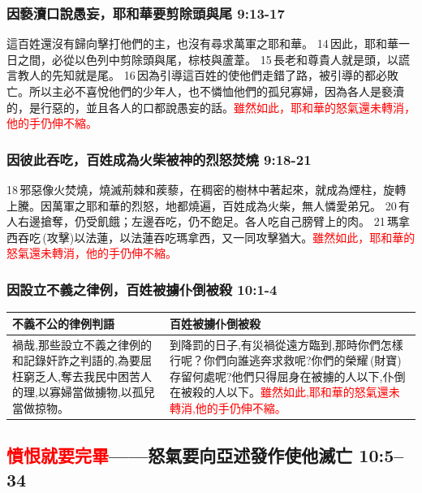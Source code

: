 \subsubsection{因褻瀆口說愚妄，耶和華要剪除頭與尾 9:13-17}
這百姓還沒有歸向擊打他們的主，也沒有尋求萬軍之耶和華。 14 因此，耶和華一日之間，必從以色列中剪除頭與尾，棕枝與蘆葦。 15 長老和尊貴人就是頭，以謊言教人的先知就是尾。 16 因為引導這百姓的使他們走錯了路，被引導的都必敗亡。所以主必不喜悅他們的少年人，也不憐恤他們的孤兒寡婦，因為各人是褻瀆的，是行惡的，並且各人的口都說愚妄的話。\textcolor{red}{雖然如此，耶和華的怒氣還未轉消，他的手仍伸不縮。}

\subsubsection{因彼此吞吃，百姓成為火柴被神的烈怒焚燒 9:18-21}
18 邪惡像火焚燒，燒滅荊棘和蒺藜，在稠密的樹林中著起來，就成為煙柱，旋轉上騰。因萬軍之耶和華的烈怒，地都燒遍，百姓成為火柴，無人憐愛弟兄。 20 有人右邊搶奪，仍受飢餓；左邊吞吃，仍不飽足。各人吃自己膀臂上的肉。 21 瑪拿西吞吃 (攻擊)以法蓮，以法蓮吞吃瑪拿西，又一同攻擊猶大。\textcolor{red}{雖然如此，耶和華的怒氣還未轉消，他的手仍伸不縮。}

\subsubsection{因設立不義之律例，百姓被擄仆倒被殺 10:1-4}
\begin{table}[H]
\centering 
\begin{tabular}{p{6.75cm}|p{11.25cm}}\hline\hline
不義不公的律例判語&百姓被擄仆倒被殺\\\hline
禍哉,那些設立不義之律例的和記錄奸詐之判語的,為要屈枉窮乏人,奪去我民中困苦人的理,以寡婦當做擄物,以孤兒當做掠物。
&到降罰的日子,有災禍從遠方臨到,那時你們怎樣行呢？你們向誰逃奔求救呢?你們的榮耀 (財寶)存留何處呢?他們只得屈身在被擄的人以下,仆倒在被殺的人以下。\textcolor{red}{雖然如此,耶和華的怒氣還未轉消,他的手仍伸不縮。}\\\hline
\end{tabular}
\end{table}

\subsection[憤恨就要完畢——怒氣要向亞述發作使他滅亡 10:5--34]{\textcolor{red}{憤恨就要完畢}——怒氣要向亞述發作使他滅亡 10:5--34}

